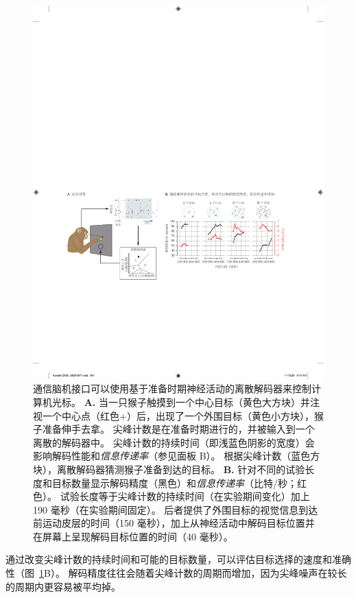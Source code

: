 \begin{figure}[htbp]
	\centering
	\includegraphics[width=1.0\linewidth]{chap39/fig_39_7}
	\caption{通信脑机接口可以使用基于准备时期神经活动的离散解码器来控制计算机光标。 
		\textbf{A.} 当一只猴子触摸到一个中心目标（黄色大方块）并注视一个中心点（红色+）后，出现了一个外围目标（黄色小方块），猴子准备伸手去拿。 
		尖峰计数是在准备时期进行的，并被输入到一个离散的解码器中。 
		尖峰计数的持续时间（即浅蓝色阴影的宽度）会影响解码性能和\textit{信息传递率}（参见面板 B）。 
		根据尖峰计数（蓝色方块），离散解码器猜测猴子准备到达的目标。 
		\textbf{B.} 针对不同的试验长度和目标数量显示解码精度（黑色）和\textit{信息传递率}（比特/秒；红色）。 
		试验长度等于尖峰计数的持续时间（在实验期间变化）加上 190 毫秒（在实验期间固定）。 
		后者提供了外围目标的视觉信息到达前运动皮层的时间（150 毫秒），加上从神经活动中解码目标位置并在屏幕上呈现解码目标位置的时间（40 毫秒）\cite{santhanam2006high}。}
	\label{fig:39_7}
\end{figure}


通过改变尖峰计数的持续时间和可能的目标数量，可以评估目标选择的速度和准确性（图~\ref{fig:39_7}B）。
解码精度往往会随着尖峰计数的周期而增加，因为尖峰噪声在较长的周期内更容易被平均掉。


